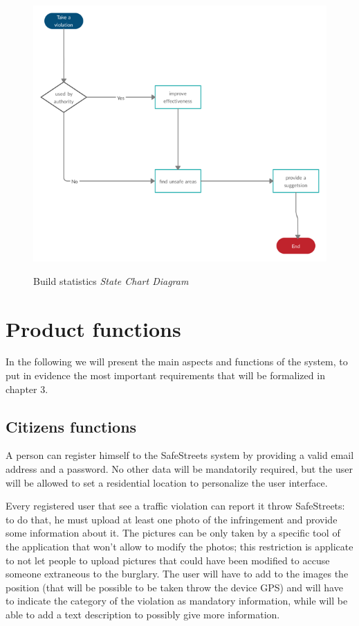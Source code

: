 \documentclass[../RASD.tex]{subfiles}
\begin{document}
    \begin{figure}[H]
        \centering
        \includegraphics[scale = 3]{assets/buildStatistics.png}\\[1.6 cm]
        \caption[ Build statistics \textit{State Chart Diagram}]{ Build statistics \textit{State Chart Diagram}}
    \end{figure}

    \section{Product functions}\label{sec:product-functions}
    In the following we will present the main aspects and functions of the system, to put in evidence the most important requirements that will be formalized in chapter 3.
    \subsection{Citizens functions}\label{subsec:citizen-functions}
    A person can register himself to the SafeStreets system by providing a valid email address and a password. No other data will be mandatorily required, but the user will be allowed to set a residential location to personalize the user interface.

    Every registered user that see a traffic violation can report it throw SafeStreets: to do that, he must upload at least one photo of the infringement and provide some information about it. The pictures can be only taken by a specific tool of the application that won't allow to modify the photos; this restriction is applicate to not let people to upload pictures that could have been modified to accuse someone extraneous to the burglary. The user will have to add to the images the position (that will be possible to be taken throw the device GPS) and will have to indicate the category of the violation as mandatory information, while will be able to add a text description to possibly give more information.
\end{document}
